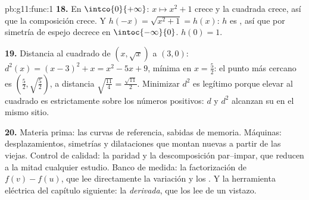 \begin{solution}{pb:g11:func:1}
\textbf{18.} En $\intco{0}{+\infty}$: $x \mapsto x^2 + 1$ crece y la 
cuadrada crece, así que la composición crece. Y
$h(-x) = \sqrt{x^2 + 1} = h(x)$: $h$ es , así que por simetría de
espejo decrece en $\intoc{-\infty}{0}$.  $h(0) = 1$.

\textbf{19.} Distancia al cuadrado de $(x, \sqrt x)$ a $(3, 0)$:
$d^2(x) = (x - 3)^2 + x = x^2 - 5x + 9$, mínima en $x = \frac52$: el punto
más cercano es $\left(\frac52, \sqrt{\frac52}\right)$, a distancia
$\sqrt{\frac{11}{4}} = \frac{\sqrt{11}}{2}$. Minimizar $d^2$ es legítimo
porque elevar al cuadrado es estrictamente  sobre los números
positivos: $d$ y $d^2$ alcanzan su  en el mismo sitio.

\textbf{20.} Materia prima: las curvas de referencia, sabidas de memoria.
Máquinas: desplazamientos, simetrías y dilataciones que montan 
nuevas a partir de las viejas. Control de calidad: la paridad y la
descomposición par--impar, que reducen a la mitad cualquier estudio. Banco
de medida: la factorización de $f(v) - f(u)$, que lee directamente la
variación y los . Y la herramienta eléctrica del capítulo
siguiente: la \emph{derivada}, que los lee de un vistazo.
\end{solution}

